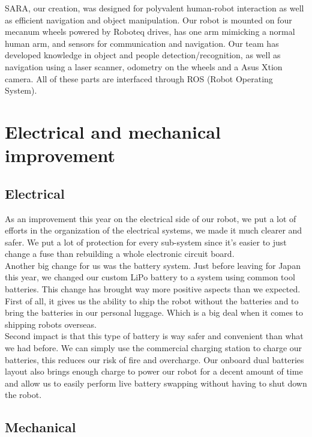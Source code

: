 \documentclass[runningheads,a4paper]{llncs}
\begin{document}
SARA, our creation, was designed for polyvalent human-robot interaction as well as efficient navigation and object manipulation. Our robot is mounted on four mecanum wheels powered by Roboteq drives, has one arm mimicking a normal human arm, and sensors for communication and navigation. Our team has developed knowledge in object and people detection/recognition, as well as navigation using a laser scanner, odometry on the wheels and a Asus Xtion camera. All of these parts are interfaced through ROS (Robot Operating System). \\

\section{Electrical and mechanical improvement}
\subsection{Electrical}

\tab As an improvement this year on the electrical side of our robot, we put a lot of efforts in the organization of the electrical systems, we made it much clearer and safer. We put a lot of protection for every sub-system since it’s easier to just change a fuse than rebuilding a whole electronic circuit board.\\

Another big change for us was the battery system. Just before leaving for Japan this year, we changed our custom LiPo battery to a system using common tool batteries. This change has brought way more positive aspects than we expected. First of all, it gives us the ability to ship the robot without the batteries and to bring the batteries in our personal luggage. Which is a big deal when it comes to shipping robots overseas.\\

Second impact is that this type of battery is way safer and convenient than what we had before. We can simply use the commercial charging station to charge our batteries, this reduces our risk of fire and overcharge. Our onboard dual batteries layout also brings enough charge to power our robot for a decent amount of time and allow us to easily perform live battery swapping without having to shut down the robot.\\



\subsection{Mechanical}
\end{document}

